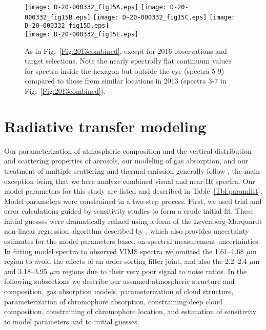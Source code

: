\documentclass[article,11pt]{emulateapj}
\def\mum{$\mu$m }
\begin{document}
\begin{figure*}[!htb]\centering
\texttt{[image: D-20-000332\_fig15A.eps]}  %
\texttt{[image: D-20-000332\_fig15B.eps]} %
\texttt{[image: D-20-000332\_fig15C.eps]} %
\texttt{[image: D-20-000332\_fig15D.eps]}\\  %
\texttt{[image: D-20-000332\_fig15E.eps]}\\ %
\caption{As in Fig.\ \ref{Fig:2013combined}, except for 2016 observations
and target selections.  Note the nearly spectrally flat continuum
values for spectra inside the hexagon but outside the eye (spectra
5-9) compared to those from similar locations in 2013
 (spectra 3-7 in Fig.\ \ref{Fig:2013combined}). \label{Fig:2016combined}}
\end{figure*}


\section{Radiative transfer modeling}

Our parameterization of atmospheric composition and the vertical
distribution and scattering properties of aerosols, our modeling of
gas absorption, and our treatment of multiple scattering and thermal
emission generally follow \cite{Sro2020spole}, the main exception
being that we here analyze combined visual and near-IR spectra.  
Our model parameters
for this study are listed and described in Table\ \ref{Tbl:paramlist}.
Model parameters were constrained in a two-step process. First, we
used trial and error calculations guided by sensitivity studies to
form a crude initial fit.  These initial guesses were dramatically
refined using a form of the Levenberg-Marquardt non-linear regression
algorithm described by \cite{Press1992}, which also provides
uncertainty estimates for the model parameters based on spectral
measurement uncertainties.  In fitting model spectra to observed
VIMS spectra we omitted the 1.61--1.68 \mum region to avoid the effects of
an order-sorting filter joint, and also the 2.2--2.4 \mum and
3.18--3.95 \mum regions due to their very poor signal to noise ratios.
In the following subsections we describe our assumed atmospheric
structure and composition, gas absorption models, parameterization of
cloud structure, parameterization of chromophore absorption,
constraining deep cloud composition, constraining of chromophore
location, and estimation of sensitivity to model parameters and to
initial guesses.
\end{document}
